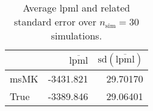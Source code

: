 \begin{table}[H]

\caption{Average lpml and related standard error over $n_{\text{sim}} = 30$ simulations.}
\centering
\begin{tabular}[t]{lrr}
\toprule
  & $\overbar{\text{lpml}}$ & $\text{sd}(\overbar{\text{lpml}})$\\
\midrule
msMK & -3431.821 & 29.70170\\
True & -3389.846 & 29.06401\\
\bottomrule
\end{tabular}
\end{table}